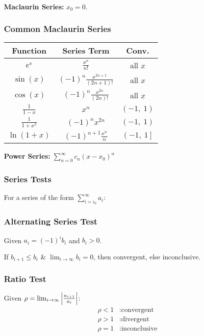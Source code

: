 \documentclass{article}
\begin{document}
\begin{multicols}{3}
    \textbf{Maclaurin Series:} $x_0 = 0$.
    \subsubsection*{Common Maclaurin Series}
    \begin{table}[H]
        \centering
        \begin{tabular}{c | c | c}
            \toprule
            \textbf{Function}         & \textbf{Series Term}                                        & \textbf{Conv.}           \\
            \midrule
            $e^{x}$                  & $\frac{x^n}{n!}$                                            & all $x$                  \\
            $\sin{\left( x \right)}$  & $\left( -1 \right)^n \frac{x^{2n+1}}{\left( 2n+1 \right)!}$ & all $x$                  \\
            $\cos{\left( x \right)}$  & $\left( -1 \right)^n \frac{x^{2n}}{\left( 2n \right)!}$     & all $x$                  \\
            $\frac{1}{1-x}$           & $x^n$                                                       & $\left( -1,\: 1 \right)$ \\
            $\frac{1}{1+x^2}$         & $\left( -1 \right)^n x^{2n}$                                & $\left( -1,\: 1 \right)$ \\
            $\ln{\left( 1+x \right)}$ & $\left( -1 \right)^{n+1} \frac{x^n}{n}$                     & $\left( -1,\: 1 \right]$ \\
            \bottomrule
        \end{tabular}
    \end{table}
    \textbf{Power Series:} $\sum_{n=0}^{\infty} c_n\left( x-x_0 \right)^n$
    \subsubsection*{Series Tests}
    For a series of the form $\displaystyle\sum_{i=i_0}^\infty a_i$:
    \subsubsection*{Alternating Series Test}
    Given $a_i = \left( -1 \right)^i b_i$ and $b_i>0$.

    If $b_{i+1}\leqslant b_i$ \& $\lim_{i\to\infty}b_i=0$, then
    convergent, else inconclusive.
    \subsubsection*{Ratio Test}
    Given $\rho = \lim_{i\to\infty}\abs{\frac{a_{i+1}}{a_i}}$:
    \begin{align*}
        \rho < 1 & : \text{convergent}   \\
        \rho > 1 & : \text{divergent}    \\
        \rho = 1 & : \text{inconclusive}
    \end{align*}

\end{multicols}
\end{document}
